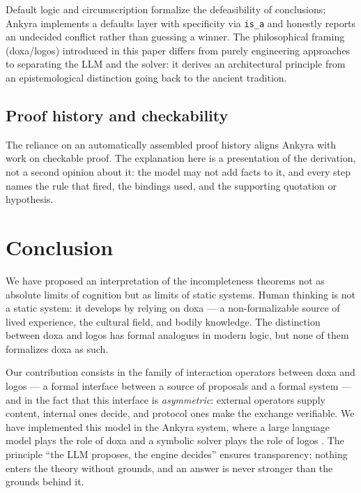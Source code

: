 \documentclass[12pt,a4paper]{article}
\begin{document}
Default logic \cite{reiter} and circumscription \cite{mccarthy} formalize the
defeasibility of conclusions; Ankyra implements a defaults layer with
specificity via \texttt{is\_a} and honestly reports an undecided conflict
rather than guessing a winner. The philosophical framing (doxa/logos)
introduced in this paper differs from purely engineering approaches to
separating the LLM and the solver: it derives an architectural principle from
an epistemological distinction going back to the ancient tradition.

\subsection{Proof history and checkability}
\label{sec:proof_history}

The reliance on an automatically assembled proof history aligns Ankyra with
work on checkable proof. The explanation here is a presentation of the
derivation, not a second opinion about it: the model may not add facts to it,
and every step names the rule that fired, the bindings used, and the
supporting quotation or hypothesis.

\section{Conclusion}
\label{sec:conclusion}

We have proposed an interpretation of the incompleteness theorems not as
absolute limits of cognition but as limits of static systems. Human thinking
is not a static system: it develops by relying on doxa --- a non-formalizable
source of lived experience, the cultural field, and bodily knowledge. The
distinction between doxa and logos has formal analogues in modern logic, but
none of them formalizes doxa as such.

Our contribution consists in the family of interaction operators between doxa
and logos --- a formal interface between a source of proposals and a formal
system --- and in the fact that this interface is \emph{asymmetric}: external
operators supply content, internal ones decide, and protocol ones make the
exchange verifiable. We have implemented this model in the Ankyra system,
where a large language model plays the role of doxa and a symbolic solver
plays the role of logos \cite{ankyra}. The principle ``the LLM proposes, the
engine decides'' ensures transparency: nothing enters the theory without
grounds, and an answer is never stronger than the grounds behind it.
\end{document}

